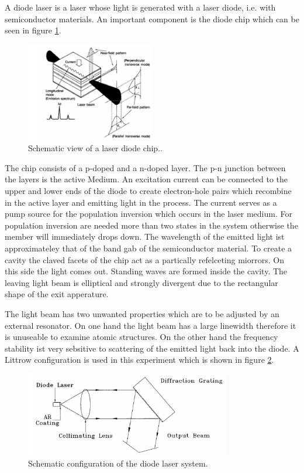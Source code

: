 A diode laser is a laser whose light is generated with a laser diode, i.e. with semiconductor materials.
An important component is the diode chip which can be seen in figure \ref{fig:diodechip}.
\begin{figure}[H]
    \centering
    \includegraphics[width=0.5\textwidth]{content/graphics/laserdiodechip.jpg}
    \caption{Schematic view of a laser diode chip..\cite{diode_laser}} %
    \label{fig:diodechip}
\end{figure}
The chip consists of a p-doped and a n-doped layer. The p-n junction between the layers is the active Medium.
An excitation current can be connected to the upper and lower ends of the diode to create electron-hole pairs which recombine in the active layer and
emitting light in the process. The current serves as a pump source for the population inversion which occurs in the laser medium.
For population inversion are needed more than two states in the system otherwise the member will immediately drops down.
The wavelength of the emitted light ist approximateley that of the band gab of the semiconductor material.
To create a cavity the claved facets of the chip act as a partically refelceting miorrors.
On this side the light comes out.
Standing waves are formed inside the cavity. The leaving light beam is elliptical and strongly divergent due to the  rectangular shape of the
exit apperature.

The light beam has two unwanted properties which are to be adjusted by an external resonator.
On one hand the light beam has a large linewidth therefore it is unuseable to examine atomic structures.
On the other hand the frequency stability ist very sebsitive to scattering of the emitted light back into the diode.
A Littrow configuration is used in this experiment which is shown in figure \ref{fig:configuration}. 
\begin{figure}[H]
    \centering
    \includegraphics[width=0.8\textwidth]{content/graphics/configuration.jpg}
    \caption{Schematic configuration of the diode laser system.\cite{diode_laser}} %
    \label{fig:configuration}
\end{figure}

